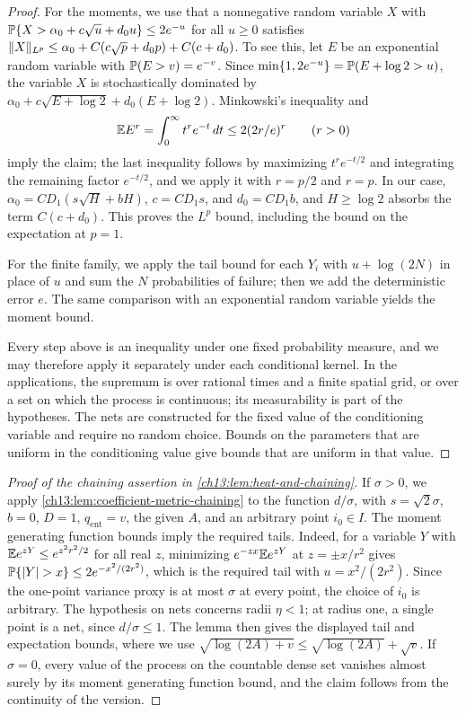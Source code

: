 \begin{proof}
For the moments, we use that a nonnegative random variable $X$ with $\mathbb P\{X>\alpha_0+c\sqrt u+d_0u\}\le2e^{-u}$ for all $u\ge0$ satisfies $\lVert X\rVert_{L^p}\le\alpha_0+C(c\sqrt p+d_0p)+C(c+d_0)$. To see this, let $E$ be an exponential random variable with $\mathbb P(E>v)=e^{-v}$. Since $\min\{1,2e^{-u}\}=\mathbb P(E+\log2>u)$, the variable $X$ is stochastically dominated by $\alpha_0+c\sqrt{E+\log2}+d_0(E+\log2)$. Minkowski's inequality and
\[
 \mathbb E E^r=\int_0^\infty t^re^{-t}\,dt\le2(2r/e)^r\qquad(r>0)
\]
imply the claim; the last inequality follows by maximizing $t^re^{-t/2}$ and integrating the remaining factor $e^{-t/2}$, and we apply it with $r=p/2$ and $r=p$. In our case, $\alpha_0=CD_1(s\sqrt H+bH)$, $c=CD_1s$, and $d_0=CD_1b$, and $H\ge\log2$ absorbs the term $C(c+d_0)$. This proves the $L^p$ bound, including the bound on the expectation at $p=1$.

For the finite family, we apply the tail bound for each $Y_i$ with $u+\log(2N)$ in place of $u$ and sum the $N$ probabilities of failure; then we add the deterministic error $e$. The same comparison with an exponential random variable yields the moment bound.

Every step above is an inequality under one fixed probability measure, and we may therefore apply it separately under each conditional kernel. In the applications, the supremum is over rational times and a finite spatial grid, or over a set on which the process is continuous; its measurability is part of the hypotheses. The nets are constructed for the fixed value of the conditioning variable and require no random choice. Bounds on the parameters that are uniform in the conditioning value give bounds that are uniform in that value.
\end{proof}

\begin{proof}[Proof of the chaining assertion in \cref{ch13:lem:heat-and-chaining}]
If $\sigma>0$, we apply \cref{ch13:lem:coefficient-metric-chaining} to the function $d/\sigma$, with $s=\sqrt2\sigma$, $b=0$, $D=1$, $q_{\mathrm{ent}}=v$, the given $A$, and an arbitrary point $i_0\in I$. The moment generating function bounds imply the required tails. Indeed, for a variable $Y$ with $\mathbb E e^{zY}\le e^{z^2r^2/2}$ for all real $z$, minimizing $e^{-zx}\mathbb E e^{zY}$ at $z=\pm x/r^2$ gives $\mathbb P\{\lvert Y\rvert>x\}\le2e^{-x^2/(2r^2)}$, which is the required tail with $u=x^2/(2r^2)$. Since the one-point variance proxy is at most $\sigma$ at every point, the choice of $i_0$ is arbitrary. The hypothesis on nets concerns radii $\eta<1$; at radius one, a single point is a net, since $d/\sigma\le1$. The lemma then gives the displayed tail and expectation bounds, where we use $\sqrt{\log(2A)+v}\le\sqrt{\log(2A)}+\sqrt v$. If $\sigma=0$, every value of the process on the countable dense set vanishes almost surely by its moment generating function bound, and the claim follows from the continuity of the version.
\end{proof}

